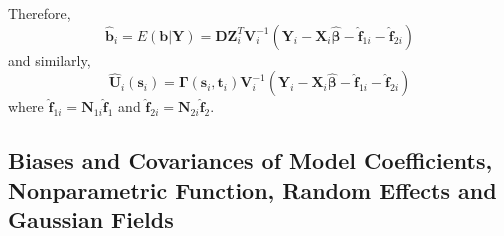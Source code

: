 \documentclass[article,lineno]{biometrika}
\begin{document}
Therefore,
\begin{equation}\label{bHat}
\boldsymbol {\hat b}_i = E(\boldsymbol b | \boldsymbol Y)
=  \boldsymbol D \boldsymbol Z_i^T   \boldsymbol V_i^{-1} 
(\boldsymbol Y_i - \boldsymbol X_i\boldsymbol{\hat \beta} -
 \boldsymbol {\hat f}_{1i} -
\boldsymbol {\hat f}_{2i})
\end{equation}
and similarly,   
\begin{equation}\label{uHat}
\bm {\hat U}_i(\bm s_i)
=
\bm \Gamma(\bm s_i, \bm t_i) \bm V_i^{-1}
(\boldsymbol Y_i - \boldsymbol X_i\boldsymbol{\hat \beta} -
 \boldsymbol {\hat f}_{1i} -
\boldsymbol {\hat f}_{2i})
\end{equation}
where $\boldsymbol {\hat f}_{1i} =  \boldsymbol N_{1i} \boldsymbol {\hat f}_1$
and 
$\boldsymbol {\hat f}_{2i} =  \boldsymbol N_{2i} \boldsymbol {\hat f}_2$. 

\subsection{Biases and Covariances of Model Coefficients, Nonparametric Function, Random Effects and Gaussian Fields} \label{biasCov}
\end{document}
